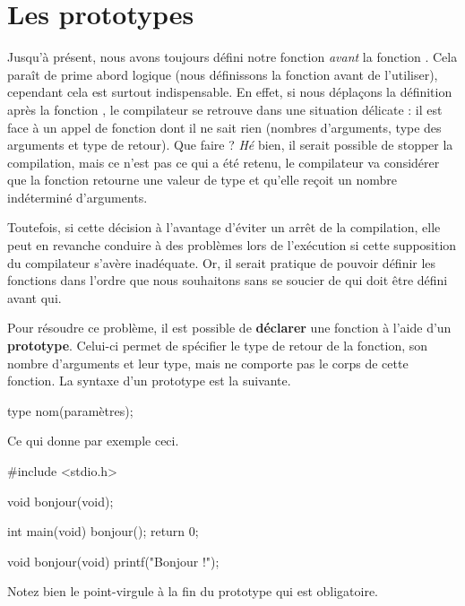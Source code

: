 \section{Les prototypes}
\label{les-prototypes}

Jusqu'à présent, nous avons toujours défini notre fonction
\emph{avant} la fonction . Cela paraît de prime abord
logique (nous définissons la fonction avant de l'utiliser), cependant
cela est surtout indispensable. En effet, si nous déplaçons la
définition après la fonction , le compilateur se retrouve
dans une situation délicate : il est face à un appel de fonction dont il
ne sait rien (nombres d'arguments, type des arguments et type de
retour). Que faire ? \emph{Hé} bien, il serait possible de stopper la
compilation, mais ce n'est pas ce qui a été retenu, le compilateur va
considérer que la fonction retourne une valeur de type  et
qu'elle reçoit un nombre indéterminé d'arguments.

Toutefois, si cette décision à l'avantage d'éviter un arrêt de la
compilation, elle peut en revanche conduire à des problèmes lors de
l'exécution si cette supposition du compilateur s'avère inadéquate. Or,
il serait pratique de pouvoir définir les fonctions dans l'ordre que
nous souhaitons sans se soucier de qui doit être défini avant qui.

Pour résoudre ce problème, il est possible de \textbf{déclarer} une
fonction à l'aide d'un \textbf{prototype}. Celui-ci permet de spécifier
le type de retour de la fonction, son nombre d'arguments et leur type,
mais ne comporte pas le corps de cette fonction. La syntaxe d'un
prototype est la suivante.

\begin{C}
type nom(paramètres);
\end{C}

Ce qui donne par exemple ceci.

\begin{C}
#include <stdio.h>

void bonjour(void);


int main(void)
{
    bonjour();
    return 0;
}


void bonjour(void)
{
    printf("Bonjour !\n");
}
\end{C}

\begin{attentionbox}
 Notez bien le point-virgule à la fin du
prototype qui est obligatoire.
\end{attentionbox}


